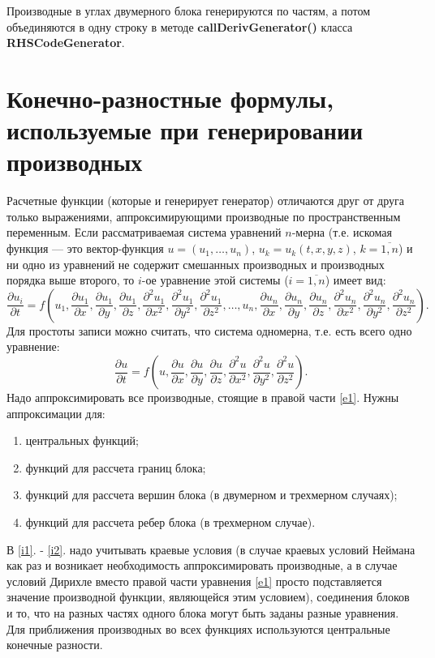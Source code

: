 \documentclass[a4paper]{article}
\begin{document}
Производные в углах двумерного блока генерируются по частям, а потом объединяются в одну строку в методе {\bf callDerivGenerator()} класса {\bf RHSCodeGenerator}.

\newpage
\section{\LARGE Конечно-разностные формулы, используемые при генерировании производных}
Расчетные функции (которые и генерирует генератор) отличаются друг от друга только выражениями, аппроксимирующими производные по пространственным пе\-ре\-мен\-ным. Если рассматриваемая система уравнений $n$-мерна (т.е. искомая функция --- это вектор-функция $u = (u_1, \ldots, u_n)$, $u_k = u_k(t,x,y,z)$, $k=\overline{1,n}$) и ни одно из уравнений не содержит смешанных производных и производных порядка выше вто\-ро\-го, то $i$-ое уравнение этой системы ($i = \overline{1,n}$) имеет вид:
\begin{equation*}
\frac{\partial u_i}{\partial t} = f\left(u_1, \frac{\partial u_1}{\partial x}, \frac{\partial u_1}{\partial y}, \frac{\partial u_1}{\partial z}, \frac{\partial^2 u_1}{\partial x^2}, \frac{\partial^2 u_1}{\partial y^2}, \frac{\partial^2 u_1}{\partial z^2}, \ldots , u_n, \frac{\partial u_n}{\partial x}, \frac{\partial u_n}{\partial y}, \frac{\partial u_n}{\partial z}, \frac{\partial^2 u_n}{\partial x^2}, \frac{\partial^2 u_n}{\partial y^2}, \frac{\partial^2 u_n}{\partial z^2} \right).
\end{equation*} 
Для простоты записи можно считать, что система одномерна, т.е. есть всего одно уравнение:
\begin{equation}\label{e1}
\frac{\partial u}{\partial t} = f\left(u, \frac{\partial u}{\partial x}, \frac{\partial u}{\partial y}, \frac{\partial u}{\partial z}, \frac{\partial^2 u}{\partial x^2}, \frac{\partial^2 u}{\partial y^2}, \frac{\partial^2 u}{\partial z^2}\right).
\end{equation} 
Надо аппроксимировать все производные, стоящие в правой части \eqref{e1}. Нужны аппро\-кси\-ма\-ции для:
\begin{enumerate}
\item центральных функций;
\item функций для рассчета границ блока; \label {i1}
\item функций для рассчета вершин блока (в двумерном и трехмерном случаях);
\item функций для рассчета ребер блока (в трехмерном случае). \label{i2}
\end{enumerate}
В \ref{i1}. - \ref{i2}. надо учитывать краевые условия (в случае краевых условий Неймана как раз и возникает необходимость аппроксимировать производные, а в случае условий Дирихле вместо правой части уравнения \eqref{e1} просто подставляется значение про\-из\-вод\-ной функции, являющейся этим условием), соединения блоков и то, что на разных частях одного блока могут быть заданы разные уравнения. Для приближения про\-из\-вод\-ных во всех функциях используются центральные конечные разности.
\end{document}
